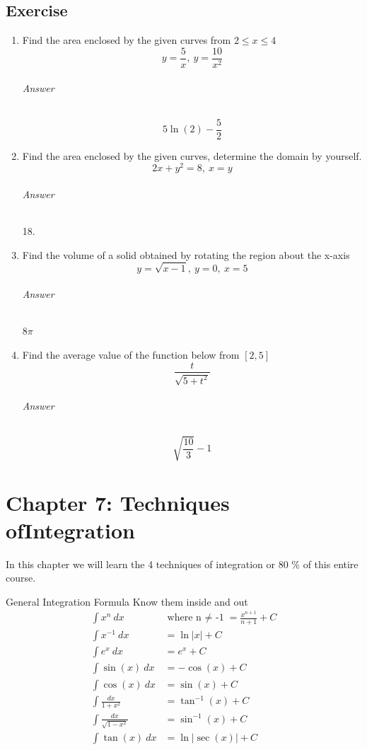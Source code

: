 \documentclass[letterpaper,10pt,twoside,twocolumn,openany]{book}
\begin{document}
\section{Exercise}
\begin{enumerate}
    \item Find the area enclosed by the given curves from $ 2 \leq x \leq 4 $ \[ y  =\frac{5}{x},\ y = \frac{10}{x^2} \] \subparagraph{Answer} \[5\ln(2)-\frac{5}{2}\]
    \item Find the area enclosed by the given curves, determine the domain by yourself. \[2x + y^2 = 8,\ x = y \] \subparagraph{Answer} 18.
    \item Find the volume of a solid obtained by rotating the region about the x-axis \[y = \sqrt{x - 1},\ y = 0 ,\ x = 5\] \subparagraph{Answer} $8\pi$
    \item Find the average value of the function below from $ [2, 5] $\[ \frac{t}{\sqrt{5 + t^2}}\] \subparagraph{Answer} \[\sqrt{\frac{10}{3}}-1\]
\end{enumerate}


\chapter{Chapter 7: Techniques of\newline Integration}
In this chapter we will learn the 4 techniques of integration or 80 \% of this entire course.
\begin{paperbox}[]{General Integration Formula}
    Know them inside and out
    \begin{align}
        \int x^n\ dx\ &\text{where n $\neq$ -1} = \frac{x^{n+1}}{n+1} + C\\
        \int x^{-1}\ dx &= \ln|x| + C\\
        \int e^x\ dx &= e^x + C\\
        \int \sin(x)\ dx &= -\cos(x) + C\\
        \int \cos(x)\ dx &= \sin(x) + C\\
        \int \frac{dx}{1+x^2} &= \tan^{-1} (x) + C\\
        \int \frac{dx}{\sqrt{1-x^2}} &= \sin^{-1} (x) + C\\
        \int \tan(x)\ dx &= \ln|\sec(x)| + C  
    \end{align} 
\end{paperbox}
\end{document}
